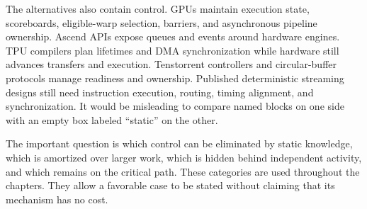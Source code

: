 The alternatives also contain control. GPUs maintain execution state, scoreboards, eligible-warp selection, barriers, and asynchronous pipeline ownership. Ascend APIs expose queues and events around hardware engines. TPU compilers plan lifetimes and DMA synchronization while hardware still advances transfers and execution. Tenstorrent controllers and circular-buffer protocols manage readiness and ownership. Published deterministic streaming designs still need instruction execution, routing, timing alignment, and synchronization. It would be misleading to compare named blocks on one side with an empty box labeled ``static'' on the other.

The important question is which control can be eliminated by static knowledge, which is amortized over larger work, which is hidden behind independent activity, and which remains on the critical path. These categories are used throughout the chapters. They allow a favorable case to be stated without claiming that its mechanism has no cost.
